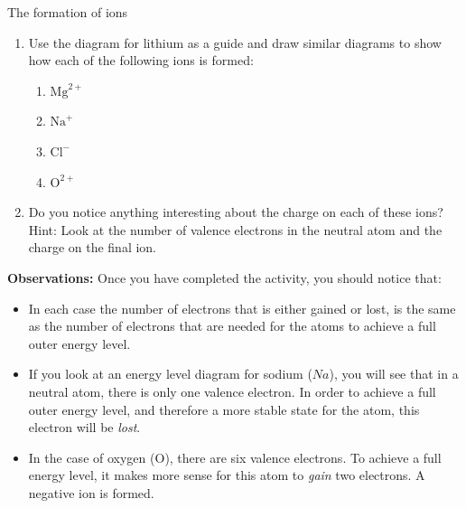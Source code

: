 \begin{activity}{The formation of ions}
            \nopagebreak
        \label{m38757*id260856}\begin{enumerate}[noitemsep, label=\textbf{\arabic*}. ] 
            \label{m38757*uid123}\item Use the diagram for lithium as a guide and draw similar diagrams to show how each of the following ions is formed:
\label{m38757*id260872}\begin{enumerate}[noitemsep, label=\textbf{\alph*}. ] 
            \label{m38757*uid124}\item ${\mathrm{Mg}}^{2+}$ \label{m38757*uid125}\item ${\mathrm{Na}}^{+}$ \label{m38757*uid126}\item ${\mathrm{Cl}}^{-}$ \label{m38757*uid127}\item ${\mathrm{O}}^{2+}$ \end{enumerate}
        \label{m38757*uid128}\item Do you notice anything interesting about the charge on each of these ions? Hint: Look at the number of valence electrons in the neutral atom and the charge on the final ion.
\end{enumerate}
        \label{m38757*id261008}\noindent{}\textbf{Observations: }\newline
    Once you have completed the activity, you should notice that:
        \label{m38757*id261012}\begin{itemize}[noitemsep]
            \label{m38757*uid129}\item In each case the number of electrons that is either gained or lost, is the same as the number of electrons that are needed for the atoms to achieve a full outer energy level.
\label{m38757*uid130}\item If you look at an energy level diagram for sodium ($Na$), you will see that in a neutral atom, there is only one valence electron. In order to achieve a full outer energy level, and therefore a more stable state for the atom, this electron will be \textsl{lost}.
\label{m38757*uid131}\item In the case of oxygen ($\mathrm{O}$), there are six valence electrons. To achieve a full energy level, it makes more sense for this atom to \textsl{gain} two electrons. A negative ion is formed.
\end{itemize}
        \par \label{m38757*eip-531}
\end{activity}            


